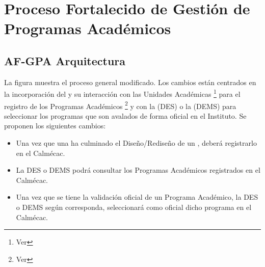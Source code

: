 


\chapter{Proceso Fortalecido de Gestión de Programas Académicos}
\hypertarget{chapter:PFGPA}{}
	\section{AF-GPA Arquitectura}

	\noindent La figura  muestra el proceso general modificado. Los cambios están centrados en la incorporación del  y su interacción con las Unidades Académicas \footnote{Ver } para el registro de los Programas Académicos \footnote{Ver } y con la  (DES) o la  (DEMS) para seleccionar los programas que son avalados de forma oficial en el Instituto. Se proponen los siguientes cambios: 

	\begin{itemize}

		\item Una vez que una  ha culminado el Diseño/Rediseño de un , deberá registrarlo en el Calmécac.
		\item La DES o DEMS podrá consultar los Programas Académicos registrados en el Calmécac.
		\item Una vez que se tiene la validación oficial de un Programa Académico, la DES o DEMS según corresponda, seleccionará como oficial dicho programa en el Calmécac.

	\end{itemize}

